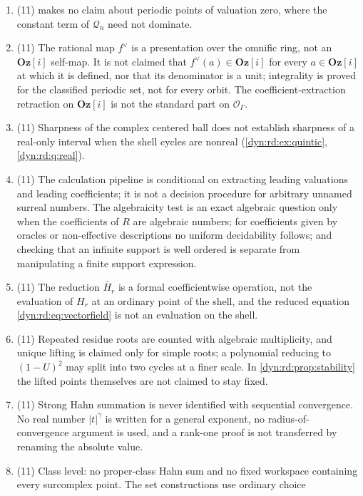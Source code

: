 \documentclass[11pt,letterpaper]{article}
\theoremstyle{definition}
\theoremstyle{remark}
\newcommand{\OO}{\mathcal O}
\newcommand{\Oz}{\mathbf{Oz}}
\numberwithin{equation}{section}
\begin{document}
\begin{enumerate}[label=\textbf{N\arabic*.},ref=\textbf{N\arabic*},leftmargin=3.2em,start=126]
\emph{infinitesimal} periodic point, not every periodic point of the
polynomial on $K_\Gamma$; other finite or infinitely large cycles of $f$
are not excluded.
\item (11)  makes no claim about periodic points
of valuation zero, where the constant term of $\mathcal Q_n$ need not
dominate.
\item (11) The rational map $f^{\vee}$ is a presentation over the omnific
ring, not an $\Oz[i]$ self-map. It is not claimed that $f^{\vee}(a)\in\Oz[i]$
for every $a\in\Oz[i]$ at which it is defined, nor that its denominator is a
unit; integrality is proved for the classified periodic set, not for every
orbit. The coefficient-extraction retraction on $\Oz[i]$ is not the standard
part on $\OO_\Gamma$.
\item (11) Sharpness of the complex centered ball does not establish
sharpness of a real-only interval when the shell cycles are nonreal
(\cref{dyn:rd:ex:quintic}, \cref{dyn:rd:q:real}).
\item (11) The calculation pipeline is conditional on extracting leading
valuations and leading coefficients; it is not a decision procedure for
arbitrary unnamed surreal numbers. The algebraicity test is an exact
algebraic question only when the coefficients of $R$ are algebraic
numbers; for coefficients given by oracles or non-effective descriptions no
uniform decidability follows; and checking that an infinite support is well
ordered is separate from manipulating a finite support expression.
\item (11) The reduction $\bar H_r$ is a formal coefficientwise operation,
not the evaluation of $H_r$ at an ordinary point of the shell, and the
reduced equation \eqref{dyn:rd:eq:vectorfield} is not an evaluation on the
shell.
\item (11) Repeated residue roots are counted with algebraic multiplicity,
and unique lifting is claimed only for simple roots; a polynomial reducing
to $(1-U)^{2}$ may split into two cycles at a finer scale. In
\cref{dyn:rd:prop:stability} the lifted points themselves are not claimed to
stay fixed.
\item (11) Strong Hahn summation is never identified with sequential
convergence. No real number $|t|^{\gamma}$ is written for a general
exponent, no radius-of-convergence argument is used, and a rank-one proof is
not transferred by renaming the absolute value.
\item (11) Class level: no proper-class Hahn sum and no fixed workspace
containing every surcomplex point. The set constructions use ordinary choice

\end{enumerate}
\end{document}
